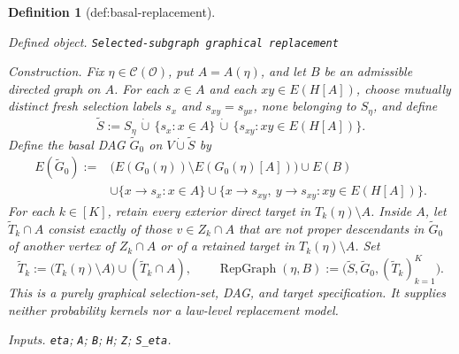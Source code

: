 \documentclass{article}
\newtheorem{definition}{Definition}
\begin{document}
\begin{definition}[def:basal-replacement]\label{def:basal-replacement}
\par\smallskip\noindent\emph{Defined object.} \texttt{Selected-\allowbreak{}subgraph graphical replacement}
\par\smallskip\noindent\emph{Construction.} Fix \(\eta\in\mathcal C(\mathcal O)\), put \(A=A(\eta)\), and let \(B\) be an admissible directed graph on \(A\). For each \(x\in A\) and each \(xy\in E(H[A])\), choose mutually distinct fresh selection labels \(s_x\) and \(s_{xy}=s_{yx}\), none belonging to \(S_\eta\), and define
\[
 \widetilde S
 :=S_\eta\,\dot\cup\,\{s_x:x\in A\}
       \,\dot\cup\,\{s_{xy}:xy\in E(H[A])\}.
\]
Define the basal DAG \(\widetilde G_0\) on \(V\dot\cup\widetilde S\) by
\[
\begin{split}
 E(\widetilde G_0):={}&
 \bigl(E(G_0(\eta))\setminus E(G_0(\eta)[A])\bigr)
 \cup E(B)\\
 &\cup\{x\to s_x:x\in A\}
 \cup\{x\to s_{xy},\ y\to s_{xy}:xy\in E(H[A])\}.
\end{split}
\]
For each \(k\in[K]\), retain every exterior direct target in \(T_k(\eta)\setminus A\). Inside \(A\), let \(\widetilde T_k\cap A\) consist exactly of those \(v\in Z_k\cap A\) that are not proper descendants in \(\widetilde G_0\) of another vertex of \(Z_k\cap A\) or of a retained target in \(T_k(\eta)\setminus A\). Set
\[
 \widetilde T_k
 :=\bigl(T_k(\eta)\setminus A\bigr)\cup(\widetilde T_k\cap A),
 \qquad
 \operatorname{RepGraph}(\eta,B)
 :=\bigl(\widetilde S,\widetilde G_0,(\widetilde T_k)_{k=1}^{K}\bigr).
\]
This is a purely graphical selection-set, DAG, and target specification. It supplies neither probability kernels nor a law-level replacement model.
\par\smallskip\noindent\emph{Inputs.} \texttt{eta}; \texttt{A}; \texttt{B}; \texttt{H}; \texttt{Z}; \texttt{S\_\allowbreak{}eta}.
\end{definition}
\end{document}
